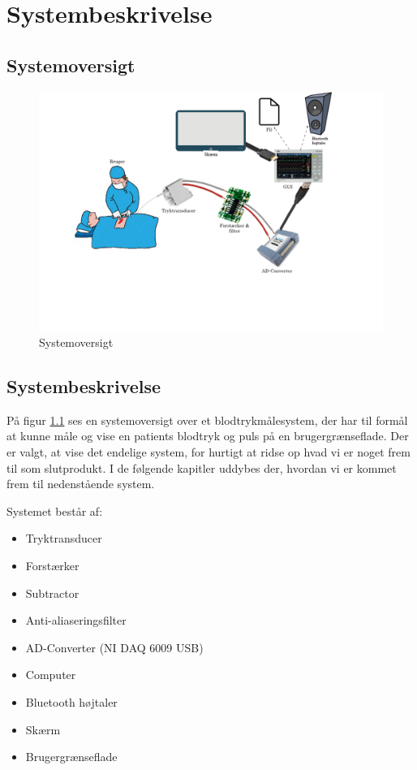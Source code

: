 \chapter{Systembeskrivelse}
\section{Systemoversigt}

	\begin{figure}[h!]
		\centering
		\includegraphics[width=0.55\linewidth]{Systembeskrivelse/Systemoversigt2}
		\caption{Systemoversigt}
		\label{fig:Systemoversigt}
	\end{figure}
\vspace{1 cm}

\section{Systembeskrivelse}
På figur \ref{fig:Systemoversigt} ses en systemoversigt over et blodtrykmålesystem, der har til formål at kunne måle
og vise en patients blodtryk og puls på en brugergrænseflade. Der er valgt, at vise det endelige system, for hurtigt at ridse op hvad vi er noget frem til som slutprodukt. I de følgende kapitler uddybes der, hvordan vi er kommet frem til nedenstående system. 

Systemet består af:

\begin{itemize}
	\item Tryktransducer
	\item Forstærker
	\item Subtractor
	\item Anti-aliaseringsfilter
	\item AD-Converter (NI DAQ 6009 USB)
	\item Computer
	\item Bluetooth højtaler
	\item Skærm
	\item Brugergrænseflade	
\end{itemize}

